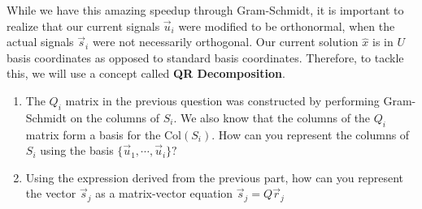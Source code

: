 

While we have this amazing speedup through Gram-Schmidt, it is important to realize that our current signals $\vec{u}_{i}$ were modified to be orthonormal, when the actual signals $\vec{s}_{i}$ were not necessarily orthogonal. Our current solution $\hat{x}$ is in $U$ basis coordinates as opposed to standard basis coordinates. Therefore, to tackle this, we will use a concept called \textbf{QR Decomposition}. 

\begin{enumerate}

  \item The $Q_{i}$ matrix in the previous question was constructed by performing Gram-Schmidt on the columns of $S_{i}.$
  We also know that the columns of the $Q_{i}$ matrix form a basis for the $\text{Col}(S_{i}).$ How can you represent the columns of $S_{i}$ using the basis $\{\vec{u}_{1}, \cdots, \vec{u}_{i} \}?$


  \item Using the expression derived from the previous part, how can you represent the vector $\vec{s}_{j}$ as a matrix-vector equation $\vec{s}_{j} = Q \vec{r}_{j}$


\end{enumerate}

